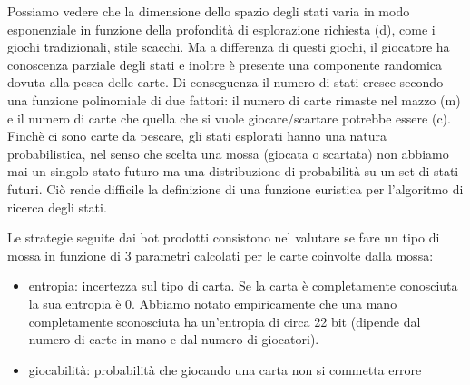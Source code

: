 \documentclass{article}
\begin{document}
\begin{flushleft}
Possiamo vedere che la dimensione dello spazio degli stati varia in modo esponenziale in funzione della profondità di esplorazione richiesta (d), come i giochi tradizionali, stile scacchi.\newline
Ma a differenza di questi giochi, il giocatore ha conoscenza parziale degli stati e inoltre è presente una componente randomica dovuta alla pesca delle carte. Di conseguenza il numero di stati cresce secondo una funzione polinomiale di due fattori: il numero di carte rimaste nel mazzo (m) e il numero di carte che quella che si vuole giocare/scartare potrebbe essere (c).\newline
\newline
Finchè ci sono carte da pescare, gli stati esplorati hanno una natura probabilistica, nel senso che scelta una mossa (giocata o scartata) non abbiamo mai un singolo stato futuro ma una distribuzione di probabilità su un set di stati futuri. Ciò rende difficile la definizione di una funzione euristica per l'algoritmo di ricerca degli stati. \newline

Le strategie seguite dai bot prodotti consistono nel valutare se fare un tipo di mossa in funzione di 3 parametri calcolati per le carte coinvolte dalla mossa:
\begin{itemize}
    \item entropia: incertezza sul tipo di carta. Se la carta è completamente conosciuta la sua entropia è 0. Abbiamo notato empiricamente che una mano completamente sconosciuta ha un'entropia di circa 22 bit (dipende dal numero di carte in mano e dal numero di giocatori).
    
    \item giocabilità: probabilità che giocando una carta non si commetta errore 
    

\end{itemize}
\end{flushleft}
\end{document}
